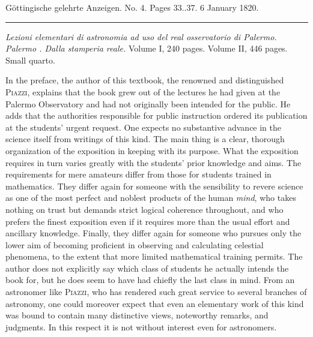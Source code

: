 \clearpage
{}
\hypertarget{native-622-lower}{}
\begin{center}\small Göttingische gelehrte Anzeigen. No. 4. Pages 33..37. 6 January 1820.\\[3pt]\rule{.72\linewidth}{.3pt}\end{center}

\noindent\emph{Lezioni elementari di astronomia ad uso del real osservatorio di Palermo. Palermo {}. Dalla stamperia reale.} Volume I, 240 pages. Volume II, 446 pages. Small quarto.

\begingroup{}\relax
In the preface, the author of this textbook, the renowned and distinguished \textsc{Piazzi}, explains that the book grew out of the lectures he had given at the Palermo Observatory and had not originally been intended for the public. He adds that the authorities responsible for public instruction ordered its publication at the students’ urgent request. One expects no substantive advance in the science itself from writings of this kind. The main thing is a clear, thorough organization of the exposition in keeping with its purpose. What the exposition requires in turn varies greatly with the students’ prior knowledge and aims. The requirements for mere amateurs differ from those for students trained in mathematics. They differ again for someone with the sensibility to revere science as one of the most perfect and noblest products of the human \emph{mind}, who takes nothing on trust but demands strict logical coherence throughout, and who prefers the finest exposition even if it requires more than the usual effort and ancillary knowledge. Finally, they differ again for someone who pursues only the lower aim of becoming proficient in observing and calculating celestial phenomena, to the extent that more limited mathematical training permits. The author does not explicitly say which class of students he actually intends the book for, but he does seem to have had chiefly the last class in mind. From an astronomer like \textsc{Piazzi}, who has rendered such great service to several branches of astronomy, one could moreover expect that even an elementary work of this kind was bound to contain many distinctive views, noteworthy remarks, and judgments. In this respect it is not without interest even for astronomers.

